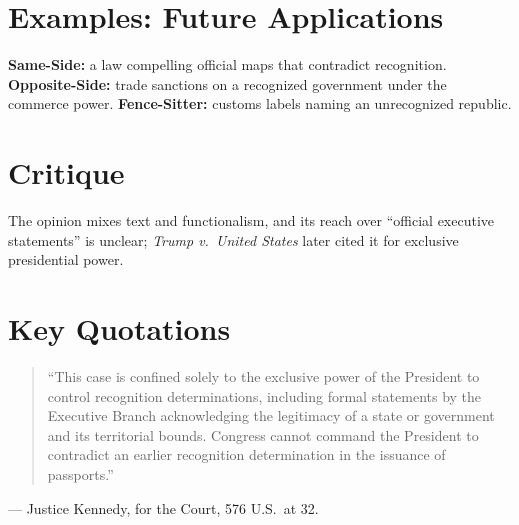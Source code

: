 \documentclass[12pt]{article}
\begin{document}
\section{Examples: Future Applications}
\textbf{Same-Side:} a law compelling official maps that contradict recognition. \textbf{Opposite-Side:} trade sanctions on a recognized government under the commerce power. \textbf{Fence-Sitter:} customs labels naming an unrecognized republic.

\section{Critique}
The opinion mixes text and functionalism, and its reach over ``official executive statements'' is unclear; \textit{Trump v.\ United States} later cited it for exclusive presidential power.

\section{Key Quotations}
\begin{quote}
``This case is confined solely to the exclusive power of the President to control recognition determinations, including formal statements by the Executive Branch acknowledging the legitimacy of a state or government and its territorial bounds. Congress cannot command the President to contradict an earlier recognition determination in the issuance of passports.''
\end{quote}
\noindent --- Justice Kennedy, for the Court, 576 U.S.\ at 32.
\end{document}
